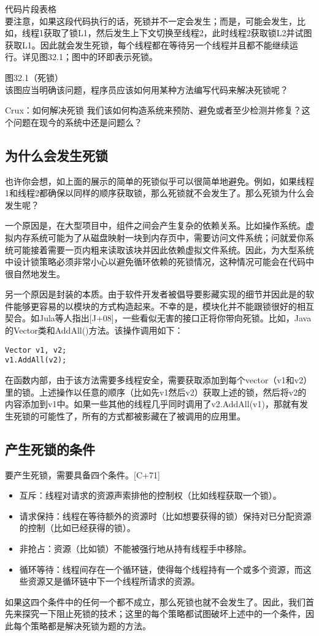 代码片段表格\\

要注意，如果这段代码执行的话，死锁并不一定会发生；而是，可能会发生，比如，线程1获取了锁L1，然后发生上下文切换至线程2，此时线程2获取锁L2并试图获取L1。因此就会发生死锁，每个线程都在等待另一个线程并且都不能继续运行。详见图32.1；图中的环即表示死锁。

图32.1（死锁）\\

该图应当明确该问题，程序员应该如何用某种方法编写代码来解决死锁呢？

Crux：如何解决死锁
我们该如何构造系统来预防、避免或者至少检测并修复？这个问题在现今的系统中还是问题么？

\subsection{为什么会发生死锁}
也许你会想，如上面的展示的简单的死锁似乎可以很简单地避免。例如，如果线程1和线程2都确保以同样的顺序获取锁，那么死锁就不会发生了。那么死锁为什么会发生呢？

一个原因是，在大型项目中，组件之间会产生复杂的依赖关系。比如操作系统。虚拟内存系统可能为了从磁盘映射一块到内存页中，需要访问文件系统；问就爱你系统可能接着需要一页内粗来读取该块并因此依赖虚拟文件系统。因此，为大型系统中设计锁策略必须非常小心以避免循环依赖的死锁情况，这种情况可能会在代码中很自然地发生。

另一个原因是封装的本质。由于软件开发者被倡导要影藏实现的细节并因此是的软件能够更容易的以模块的方式构造起来。不幸的是，模块化并不能跟锁很好的相互契合。如Jula等人指出[J+08]，一些看似无害的接口正将你带向死锁。比如，Java的Vector类和AddAll()方法。该操作调用如下：
\begin{verbatim}
Vector v1, v2;
v1.AddAll(v2);
\end{verbatim}
在函数内部，由于该方法需要多线程安全，需要获取添加到每个vector（v1和v2）里的锁。上述操作以任意的顺序（比如先v1然后v2）获取上述的锁，然后将v2的内容添加到v1中。如果一些其他的线程几乎同时调用了v2.AddAll(v1)，那就有发生死锁的可能性了，所有的方式都被影藏在了被调用的应用里。

\subsection{产生死锁的条件}
要产生死锁，需要具备四个条件。[C+71]

\begin{itemize}
\item 互斥：线程对请求的资源声索排他的控制权（比如线程获取一个锁）。
\item 请求保持：线程在等待额外的资源时（比如想要获得的锁）保持对已分配资源的控制（比如已经获得的锁）。
\item 非抢占：资源（比如锁）不能被强行地从持有线程手中移除。
\item 循环等待：线程间存在一个循环链，使得每个线程持有一个或多个资源，而这些资源又是循环链中下一个线程所请求的资源。
\end{itemize}
如果这四个条件中的任何一个都不成立，那么死锁也就不会发生了。因此，我们首先来探究一下阻止死锁的技术；这里的每个策略都试图破坏上述中的一个条件，因此每个策略都是解决死锁为题的方法。

